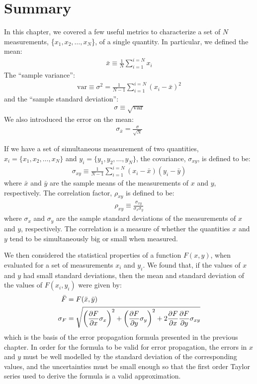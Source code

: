 \section{Summary}
\begin{chapterSummary}
In this chapter, we covered a few useful metrics to characterize a set of $N$ measurements, \{$x_1, x_2, \dots,x_N$\}, of a single quantity. In particular, we defined the mean:
\begin{align}
 \bar{x} \equiv \frac{1}{N} \sum_{i=1}^{i=N} x_i 
\end{align}
The ``sample variance'':
\begin{align}
 \text{var}\equiv \sigma^2 = \frac{1}{N-1} \sum_{i=1}^{i=N} (x_i-\bar{x})^2 
\end{align}
and the ``sample standard deviation'': 
\begin{align}
 \sigma\equiv\sqrt{\text{var}}
\end{align}
We also introduced the error on the mean:
\begin{align}
 \sigma_{\bar x}= \frac{\sigma}{\sqrt N}
\end{align}

If we have a set of simultaneous measurement of two quantities, $x_i=\{x_1, x_2,\dots, x_N\}$ and $y_i=\{y_1, y_2,\dots, y_N\}$, the covariance, $\sigma_{xy}$, is defined to be:
\begin{align}
\sigma_{xy}\equiv\frac{1}{N-1}\sum_{i=1}^{i=N}(x_i-\bar x)(y_i-\bar y)
\end{align}
where $\bar x$ and $\bar y$ are the sample means of the measurements of $x$ and $y$, respectively. The correlation factor, $\rho_{xy}$ is defined to be:
\begin{align}
\rho_{xy}\equiv\frac{\sigma_{xy}}{\sigma_x\sigma_y}
\end{align}
where $\sigma_x$ and $\sigma_y$ are the sample standard deviations of the measurements of $x$ and $y$, respectively. The correlation is a measure of whether the quantities $x$ and $y$ tend to be simultaneously big or small when measured.

We then considered the statistical properties of a function $F(x,y)$, when evaluated for a set of measurements $x_i$ and $y_i$. We found that, if the values of $x$ and $y$ had small standard deviations, then the mean and standard deviation of the values of $F(x_i,y_i)$ were given by:
\begin{align}
\bar F &=F(\bar x,\bar y)\\
\sigma_F&=\sqrt{\left(\frac{\partial F}{\partial x}\sigma_x\right)^2+\left(\frac{\partial F}{\partial y}\sigma_y\right)^2+2\frac{\partial F}{\partial x}\frac{\partial F}{\partial y}\sigma_{xy}}
\end{align}
which is the basis of the error propagation formula presented in the previous chapter. In order for the formula to be valid for error propagation, the errors in $x$ and $y$ must be well modelled by the standard deviation of the corresponding values, and the uncertainties must be small enough so that the first order Taylor series used to derive the formula is a valid approximation.


\end{chapterSummary}

